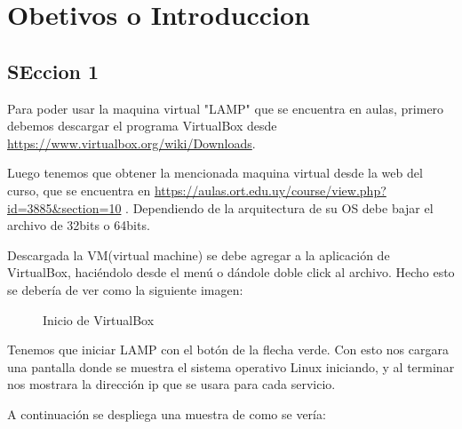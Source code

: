 \chapter{Obetivos o Introduccion}
    \section{SEccion 1}
    Para poder usar la maquina virtual "LAMP" que se encuentra en aulas, primero debemos descargar el programa VirtualBox desde \url{https://www.virtualbox.org/wiki/Downloads}.
    
    Luego tenemos que obtener la mencionada maquina virtual desde la web del curso, que se encuentra en \url{https://aulas.ort.edu.uy/course/view.php?id=3885&section=10} .
    Dependiendo de la arquitectura de su OS debe bajar el archivo de 32bits o 64bits.
    
    Descargada la VM(virtual machine) se debe agregar a la aplicación de VirtualBox, haciéndolo desde el menú o dándole doble click al archivo. Hecho esto se debería de ver como la siguiente imagen:
    \begin{figure} [H]
            \centering
            \caption{Inicio de VirtualBox}
    \end{figure}
    
    \clearpage
    Tenemos que iniciar LAMP con el botón de la flecha verde. Con esto nos cargara una pantalla donde se muestra el sistema operativo Linux iniciando, y al terminar nos mostrara la dirección ip que se usara para cada servicio.
    
    A continuación se despliega una muestra de como se vería:
    
